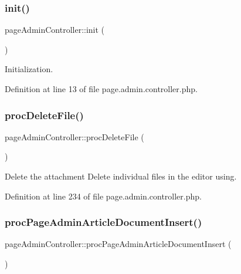 \subsubsection{\texorpdfstring{init()}{init()}}
{\footnotesize\ttfamily page\+Admin\+Controller\+::init (\begin{DoxyParamCaption}{ }\end{DoxyParamCaption})}



Initialization. 



Definition at line 13 of file page.\+admin.\+controller.\+php.

\hypertarget{classpageAdminController_a79f90d79016b9550455e80c2ab6f72d8}{}\label{classpageAdminController_a79f90d79016b9550455e80c2ab6f72d8} 
\subsubsection{\texorpdfstring{proc\+Delete\+File()}{procDeleteFile()}}
{\footnotesize\ttfamily page\+Admin\+Controller\+::proc\+Delete\+File (\begin{DoxyParamCaption}{ }\end{DoxyParamCaption})}



Delete the attachment Delete individual files in the editor using. 



Definition at line 234 of file page.\+admin.\+controller.\+php.

\hypertarget{classpageAdminController_a5ffba4fec0a2c2bd86b4c67fcaff61e8}{}\label{classpageAdminController_a5ffba4fec0a2c2bd86b4c67fcaff61e8} 
\subsubsection{\texorpdfstring{proc\+Page\+Admin\+Article\+Document\+Insert()}{procPageAdminArticleDocumentInsert()}}
{\footnotesize\ttfamily page\+Admin\+Controller\+::proc\+Page\+Admin\+Article\+Document\+Insert (\begin{DoxyParamCaption}{ }\end{DoxyParamCaption})}



